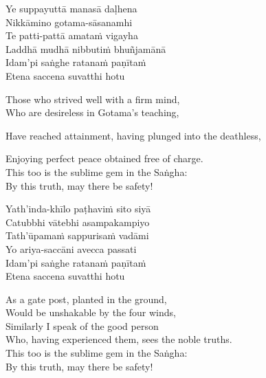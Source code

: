 \begin{pali-hang-continued}
  Ye suppayuttā manasā daḷhena\\
  Nikkāmino gotama-sāsanamhi\\
  Te patti-pattā amataṁ vigayha\\
  Laddhā mudhā nibbutiṁ bhuñjamānā\\
  Idam'pi saṅghe ratanaṁ paṇītaṁ\\
  Etena saccena suvatthi hotu
\end{pali-hang-continued}

\begin{english-verses}
  Those who strived well with a firm mind,\\
  Who are desireless in Gotama's teaching,\\
  \begin{english-hang-together-verses}
  Have reached attainment, having plunged into the deathless,\\
  \end{english-hang-together-verses}
  Enjoying perfect peace obtained free of charge.\\
  This too is the sublime gem in the Saṅgha:\\
  By this truth, may there be safety!
\end{english-verses}

\ifbfive\clearpage\fi
\ifafive\clearpage\fi

\begin{pali-hang-continued}
  Yath'inda-khīlo paṭhaviṁ sito siyā\\
  Catubbhi vātebhi asampakampiyo\\
  Tath'ūpamaṁ sappurisaṁ vadāmi\\
  Yo ariya-saccāni avecca passati\\
  Idam'pi saṅghe ratanaṁ paṇītaṁ\\
  Etena saccena suvatthi hotu
\end{pali-hang-continued}

\ifninebythirteen\clearpage\fi

\begin{english-verses}
  As a gate post, planted in the ground,\\
  Would be unshakable by the four winds,\\
  Similarly I speak of the good person\\
  Who, having experienced them, sees the noble truths.\\
  This too is the sublime gem in the Saṅgha:\\
  By this truth, may there be safety!
\end{english-verses}

